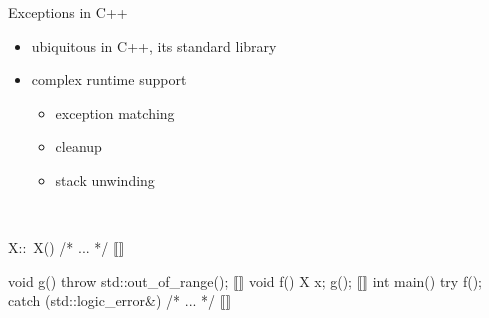 \documentclass[aspectratio=169, fi]{paradise-slide}
\begin{document}
\newcommand{\arr}[1]{\visible<#1>{\textcolor{red}{$\mathbf{\longleftarrow}$}}}
\begin{frame}[fragile]{Exceptions in C++}
  \begin{minipage}{0.47\textwidth}
    \setlength{\leftmargini}{1em}
    \begin{itemize}
      \item ubiquitous in C++, its standard library
      \item complex runtime support
        \begin{itemize}
          \item exception matching
          \item cleanup
          \item stack unwinding
        \end{itemize}
    \end{itemize}

    \bigskip
    \medskip\\
  \end{minipage}
  \hfill
  \pause
  \begin{minipage}{0.47\textwidth}
    \begin{cppcodeln}
      X::~X() { /* ... */ } ⟦\arr{4}⟧

      void g() {
        throw std::out_of_range(); ⟦\arr{2}⟧
      }
      void f() {
        X x;
        g();
      } ⟦\arr{3}⟧
      int main() {
        try {
          f();
        } catch (std::logic_error&) {
          /* ... */ ⟦\arr{5}⟧
        }
      }
    \end{cppcodeln}
  \end{minipage}
\end{frame}
\end{document}
